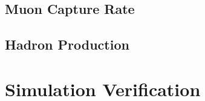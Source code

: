 \section{Muon Capture Rate} %
\label{sec:muon_capture_rate}

\section{Hadron Production} %
\label{sec:hadron_production}

\chapter{Simulation Verification} %
\label{cha:simulation_verification}

